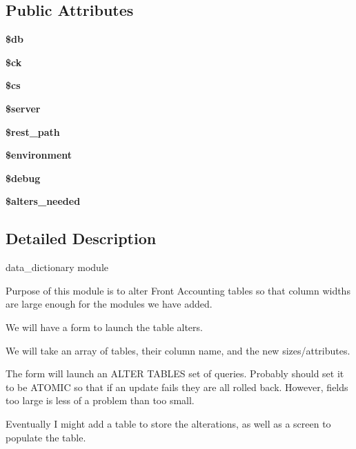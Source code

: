 \subsection*{Public Attributes}
\begin{DoxyCompactItemize}
\item 
\hypertarget{classksf__data__dictionary_a073be682441a5cac9003e3b1d35add67}{}\label{classksf__data__dictionary_a073be682441a5cac9003e3b1d35add67} 
{\bfseries \$db}
\item 
\hypertarget{classksf__data__dictionary_ae9ffadd22abc35408de8169e195d9c60}{}\label{classksf__data__dictionary_ae9ffadd22abc35408de8169e195d9c60} 
{\bfseries \$ck}
\item 
\hypertarget{classksf__data__dictionary_acef5fa3bf3049242c863eefdd829f306}{}\label{classksf__data__dictionary_acef5fa3bf3049242c863eefdd829f306} 
{\bfseries \$cs}
\item 
\hypertarget{classksf__data__dictionary_a8f8039fa67a90e858eb3affbc8899f2c}{}\label{classksf__data__dictionary_a8f8039fa67a90e858eb3affbc8899f2c} 
{\bfseries \$server}
\item 
\hypertarget{classksf__data__dictionary_ad9cee0d471b634e5e231b3b2283fbd43}{}\label{classksf__data__dictionary_ad9cee0d471b634e5e231b3b2283fbd43} 
{\bfseries \$rest\+\_\+path}
\item 
\hypertarget{classksf__data__dictionary_a52e49c26728a76d726311d6ce6a4604e}{}\label{classksf__data__dictionary_a52e49c26728a76d726311d6ce6a4604e} 
{\bfseries \$environment}
\item 
\hypertarget{classksf__data__dictionary_ac5293f7337f3c456435a15fb3a36790b}{}\label{classksf__data__dictionary_ac5293f7337f3c456435a15fb3a36790b} 
{\bfseries \$debug}
\item 
\hypertarget{classksf__data__dictionary_a1897d718b0ce22d30ffc8d4a4eff0f05}{}\label{classksf__data__dictionary_a1897d718b0ce22d30ffc8d4a4eff0f05} 
{\bfseries \$alters\+\_\+needed}
\end{DoxyCompactItemize}


\subsection{Detailed Description}
data\+\_\+dictionary module \begin{DoxyVerb}Purpose of this module is to alter Front Accounting tables
so that column widths are large enough for the modules
we have added.

We will have a form to launch the table alters.

We will take an array of tables, their column name,
and the new sizes/attributes.

The form will launch an ALTER TABLES set of queries.
Probably should set it to be ATOMIC so that if an update
fails they are all rolled back.  However, fields too large
is less of a problem than too small.

Eventually I might add a table to store the alterations,
as well as a screen to populate the table.\end{DoxyVerb}


